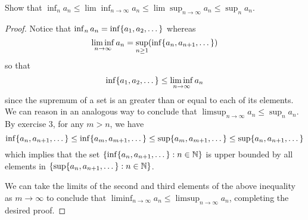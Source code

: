 \begin{exercise}{22}
Show that $\inf_na_n\leq \lim\inf_{n\to\infty}a_n\leq \lim\sup_{n\to\infty}a_n\leq \sup_na_n$.
\end{exercise}
\begin{proof}
Notice that $\inf_na_n = \inf\{a_1,a_2,\dots\}$ whereas
$$\liminf_{n\to\infty}a_n=\sup_{n\geq 1}(\inf\{a_n,a_{n+1},\dots\})$$
so that
$$\inf\{a_1,a_2,\dots\}\leq\liminf_{n\to\infty}a_n$$ since the supremum of a set is an greater than or equal to each of its elements. We can reason in an analogous way to conclude that $\limsup_{n\to\infty}a_n\leq \sup_na_n$.\\

By exercise 3, for any $m>n$, we have 
\[
\inf\{a_n,a_{n+1},\dots\}
\leq\inf\{a_m,a_{m+1},\dots\} \leq\sup\{a_m,a_{m+1},\dots\} \leq\sup\{a_n,a_{n+1},\dots\}
\]
which implies that the set $\{\inf\{a_n,a_{n+1},\dots\}:n\in\mathbb{N}\}$ is upper bounded by all elements in $\{\sup\{a_n,a_{n+1},\dots\}:n\in\mathbb{N}\}$.

We can take the limits of the second and third elements of the above inequality as $m\to\infty$ to conclude that $\liminf_{n\to\infty}a_n\leq\limsup_{n\to\infty}a_n$, completing the desired proof.



\end{proof}

